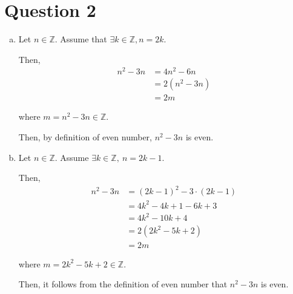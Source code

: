 \documentclass[12pt]{article}
\begin{document}
\section*{Question 2}
\begin{enumerate}[a.]
    \item

    Let $n \in \mathbb{Z}$. Assume that $\exists k \in \mathbb{Z}, n = 2k$.

    \bigskip

    Then,
    \setcounter{equation}{0}
    \begin{align}
        n^2 - 3n &= 4n^2 - 6n\\
        &= 2(n^2 - 3n)\\
        &= 2m
    \end{align}

    where $m = n^2 - 3n \in \mathbb{Z}$.

    \bigskip

    Then, by definition of even number, $n^2 - 3n$ is even.

    \item

    Let $n \in \mathbb{Z}$. Assume $\exists k \in \mathbb{Z},\:n = 2k - 1$.

    \bigskip

    Then,
    \setcounter{equation}{0}
    \begin{align}
        n^2 - 3n &= (2k - 1)^2 - 3 \cdot (2k - 1)\\
        &= 4k^2 - 4k + 1 -6k +3\\
        &= 4k^2 - 10k + 4\\
        &= 2(2k^2 - 5k + 2)\\
        &= 2m
    \end{align}

    where $m = 2k^2 - 5k + 2 \in \mathbb{Z}$.

    \bigskip

    Then, it follows from the definition of even number that $n^2-3n$ is even.
\end{enumerate}
\end{document}
